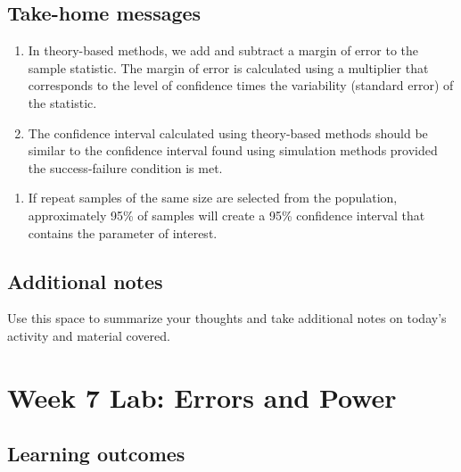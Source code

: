 \documentclass[
]{report}
\providecommand{\tightlist}{%
  \setlength{\itemsep}{0pt}\setlength{\parskip}{0pt}}
\begin{document}
\vspace{0.8in}

\hypertarget{take-home-messages-12}{%
\subsection{Take-home messages}\label{take-home-messages-12}}

\begin{enumerate}
\def\labelenumi{\arabic{enumi}.}
\item
  In theory-based methods, we add and subtract a margin of error to the sample statistic. The margin of error is calculated using a multiplier that corresponds to the level of confidence times the variability (standard error) of the statistic.
\item
  The confidence interval calculated using theory-based methods should be similar to the confidence interval found using simulation methods provided the success-failure condition is met.
\end{enumerate}

\begin{enumerate}
\def\labelenumi{\arabic{enumi}.}
\setcounter{enumi}{2}
\tightlist
\item
  If repeat samples of the same size are selected from the population, approximately 95\% of samples will create a 95\% confidence interval that contains the parameter of interest.
\end{enumerate}

\hypertarget{additional-notes-11}{%
\subsection{Additional notes}\label{additional-notes-11}}

Use this space to summarize your thoughts and take additional notes on today's activity and material covered.

\newpage

\hypertarget{week-7-lab-errors-and-power}{%
\section{Week 7 Lab: Errors and Power}\label{week-7-lab-errors-and-power}}


\hypertarget{learning-outcomes-13}{%
\subsection{Learning outcomes}\label{learning-outcomes-13}}
\end{document}
